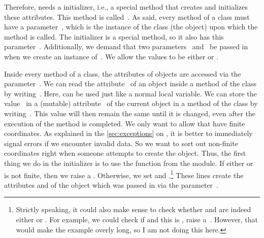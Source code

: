 Therefore,  needs a initializer, i.e., a special method that creates and initializes these attributes.
This method is called~.
As said, every method of a class must have a parameter~, which is the instance of the class (the object) upon which the method is called.
The initializer  is a special method, so it also has this parameter~.
Additionally, we demand that two parameters~ and~ be passed in when we create an instance of~.
We allow the values to be either  or .

Inside every method of a class, the attributes of objects are accessed via the parameter~.
We can read the attribute~ of an object inside a method of the class by writing~.
Here,  can be used just like a normal local variable.
We can store the value~ in a (mutable) attribute~ of the current object in a method of the class by writing~.
This value will then remain the same until it is changed, even after the execution of the method is completed.%
%
%
We only want to allow  that have finite coordinates.
As explained in the \cref{sec:exceptions} on , it is better to immediately signal errors if we encounter invalid data.
So we want to sort out non-finite coordinates right when someone attempts to create the  object.
Thus, the first thing we do in the initializer is to use the  function from the  module.
If either  or  is not finite, then we raise a .
Otherwise, we set  and .\footnote{%
Strictly speaking, it could also make sense to check whether  and  are indeed either  or . %
For example, we could check if  and this is , raise a~. %
However, that would make the example overly long, so I am not doing this here.%
}
These lines create the attributes  and  of the object which was passed in via the parameter~.
